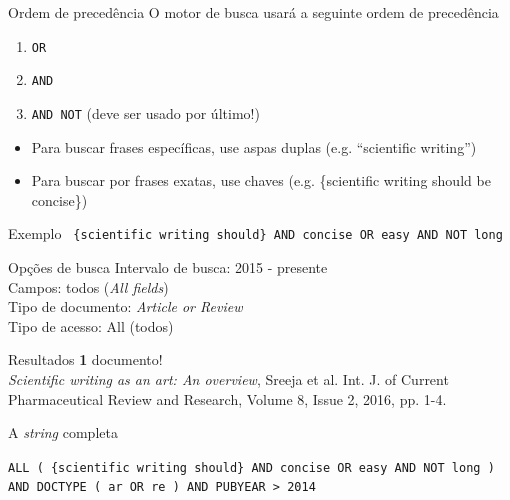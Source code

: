 \begin{frame}{Ordem de precedência}
O motor de busca usará a seguinte ordem de precedência
\begin{enumerate}
\item \texttt{OR} 
\item \texttt{AND} 
\item \texttt{AND NOT}  (deve ser usado por último!)
\end{enumerate}
\begin{itemize}
\item Para buscar frases específicas, use aspas duplas (e.g. ``scientific writing'')
\item Para buscar por frases exatas, use chaves (e.g. \{scientific writing should be concise\})
\end{itemize}
\end{frame}

\begin{frame}
\begin{block}{Exemplo}
\texttt{ \{scientific writing should\} AND concise OR easy AND NOT long}
\end{block}
\begin{block}{Opções de busca}
Intervalo de busca: 2015 - presente \\
Campos: todos (\emph{All fields}) \\
Tipo de documento: \emph{Article or Review} \\
Tipo de acesso: All (todos) 
\end{block}
\begin{block}{Resultados}
\textbf{1} documento! \\
\textit{Scientific writing as an art: An overview}, Sreeja et al. Int. J. of Current Pharmaceutical Review and Research, Volume 8, Issue 2, 2016, pp. 1-4.
\end{block}
\end{frame}

\begin{frame}{A \textit{string} completa}
\begin{block}
\texttt{ALL ( \{scientific writing should\}  AND  concise  OR  easy  AND NOT  long )  AND  DOCTYPE ( ar  OR  re )  AND  PUBYEAR  >  2014 }
\end{block}
\end{frame}


